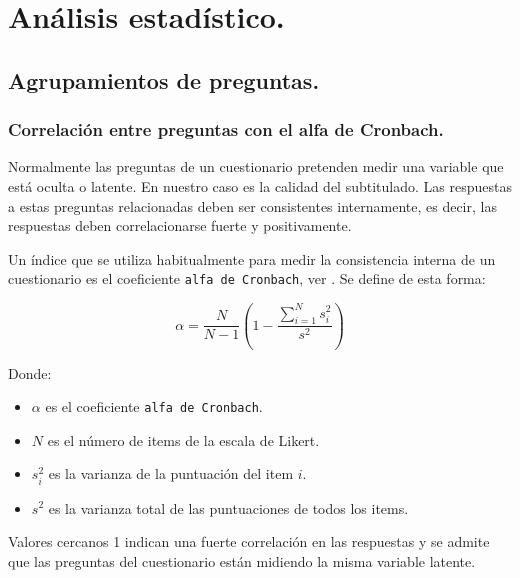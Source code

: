 \documentclass[
  12pt,
  a4paper,
  extrafontsizes,
  onecolumn,
  openright]{memoir}
\providecommand{\tightlist}{%
  \setlength{\itemsep}{0pt}\setlength{\parskip}{0pt}}\usepackage{longtable,booktabs,array}
\begin{document}

\hypertarget{sec-analisis}{%
\chapter{Análisis estadístico.}\label{sec-analisis}}

\hypertarget{sec-cluster}{%
\section{Agrupamientos de preguntas.}\label{sec-cluster}}

\hypertarget{sec-cronbach}{%
\subsection{Correlación entre preguntas con el alfa de
Cronbach.}\label{sec-cronbach}}

Normalmente las preguntas de un cuestionario pretenden medir una
variable que está oculta o latente. En nuestro caso es la calidad del
subtitulado. Las respuestas a estas preguntas relacionadas deben ser
consistentes internamente, es decir, las respuestas deben
correlacionarse fuerte y positivamente.

Un índice que se utiliza habitualmente para medir la consistencia
interna de un cuestionario es el coeficiente
\texttt{alfa\ de\ Cronbach}, ver \textcite{schweinberger2020survey}. Se
define de esta forma:

\begin{equation}
\alpha = \frac{N}{N-1} \left(1 - \frac{\sum_{i=1}^{N} s_{i}^{2}}{s^{2}} \right)
\end{equation}

Donde:

\begin{itemize}
\tightlist
\item
  \(\alpha\) es el coeficiente \texttt{alfa\ de\ Cronbach}.
\item
  \(N\) es el número de items de la escala de Likert.
\item
  \(s_{i}^{2}\) es la varianza de la puntuación del item \(i\).
\item
  \(s^{2}\) es la varianza total de las puntuaciones de todos los items.
\end{itemize}

Valores cercanos 1 indican una fuerte correlación en las respuestas y se
admite que las preguntas del cuestionario están midiendo la misma
variable latente.
\end{document}
